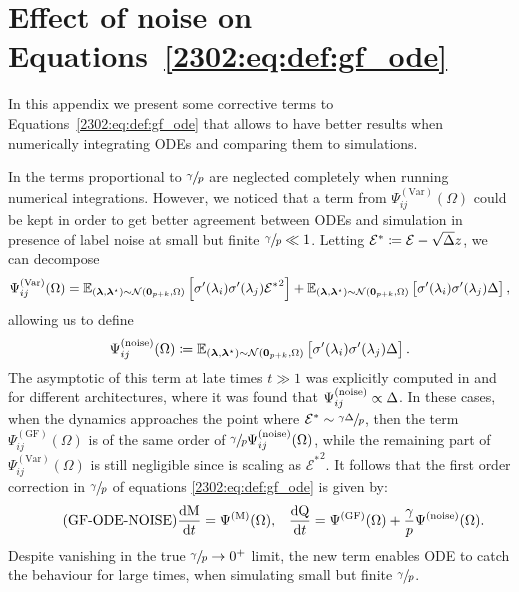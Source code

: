 \section{Effect of noise on Equations~\texorpdfstring{\eqref{2302:eq:def:gf_ode}}{\ref{2302:eq:def:gf_ode}}}

\label{2302:app:noise-term}
In this appendix we present some corrective terms to Equations~\eqref{2302:eq:def:gf_ode} that allows to have better results when numerically integrating ODEs and comparing them to simulations.

In \cite{veiga2022phase} the terms proportional to $\sfrac{\gamma}{p}$ are neglected completely when running numerical integrations. However, we noticed that a term from $\Psi^{(\mathrm{Var})}_{ij}(\Omega)$ could be kept in order to get better agreement between ODEs and simulation in presence of label noise at small but finite $\sfrac{\gamma}{p}\ll 1$.
Letting \(\mathcal{E}^*  \coloneqq \mathcal{E} - \sqrt{\Delta}z\), we can decompose
\[
    \Psi^{(\mathrm{Var})}_{ij}(\Omega) = \mathbb E_{({\boldsymbol{\lambda}},{\boldsymbol{\lambda}}^{\star})\sim\mathcal{N}({\boldsymbol{0}}_{p+k}, \Omega)} \left[\sigma'(\lambda_i)\sigma'(\lambda_j) {\mathcal{E}^*}^2 \right] + \mathbb E_{({\boldsymbol{\lambda}},{\boldsymbol{\lambda}}^{\star})\sim\mathcal{N}({\boldsymbol{0}}_{p+k}, \Omega)} \left[\sigma'(\lambda_i)\sigma'(\lambda_j) \Delta \right],
\]
allowing us to define
\begin{equation}
    \Psi^{(\mathrm{noise})}_{ij}(\Omega) \coloneqq \mathbb E_{({\boldsymbol{\lambda}},{\boldsymbol{\lambda}}^{\star})\sim\mathcal{N}({\boldsymbol{0}}_{p+k}, \Omega)} \left[\sigma'(\lambda_i)\sigma'(\lambda_j) \Delta \right].
\end{equation}
The asymptotic of this term at late times $t\gg 1$ was explicitly computed in \cite{biehl1995learning} and \cite{goldt2019dynamics} for different architectures, where it was found that $\Psi^{(\mathrm{noise})}_{ij} \propto \Delta$. In these cases, when the dynamics approaches the point where \(\mathcal{E}^* \sim \sfrac{\gamma\Delta}{p}\), then the term $\Psi^{(\mathrm{GF})}_{ij}(\Omega)$ is of the same order of $\sfrac{\gamma}{p}\Psi^{(\mathrm{noise})}_{ij}(\Omega)$, while the remaining part of $\Psi^{(\mathrm{Var})}_{ij}(\Omega)$ is still negligible since is scaling as \({\mathcal{E}^*}^2\). 
It follows that the first order correction in $\sfrac{\gamma}{p}$ of equations \eqref{2302:eq:def:gf_ode} is given by: 
\begin{align}
\tag{GF-ODE-NOISE}\label{2302:eq:def:ode_gf_withnoise}
\frac{\text{d}\mathrm{M}}{\text{d} t} = \Psi^{(\mathrm{M})}(\Omega), && \frac{\text{d}\mathrm{Q}}{\text{d} t} =  \Psi^{(\mathrm{GF})}(\Omega) + \frac{\gamma}{p}\Psi^{(\mathrm{noise})}(\Omega).
\end{align}
Despite vanishing in the true $\sfrac{\gamma}{p}\to0^+$ limit, the new term enables ODE to catch the behaviour for large times, when simulating small but finite \(\sfrac{\gamma}{p}\). 

